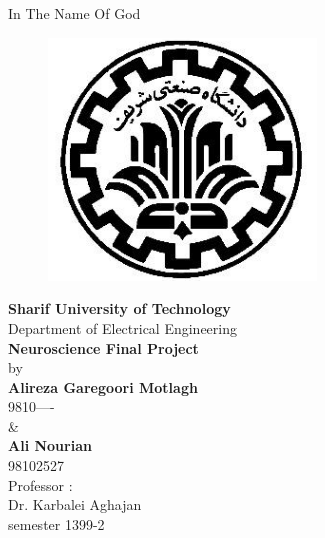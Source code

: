 \documentclass[12pt,a4paper,colorlinks=true]{article}
\begin{document}
	
	
	\begin{center}
		\small In The Name Of God
	\end{center}
	\vspace{0.3in}
	\begin{figure}[h]
		\centering
		\includegraphics[width=2.8in]{SharifLogo.png}
		\label{SharifLogo}
	\end{figure}
	\begin{center}
		\textbf{\Huge Sharif University of Technology}\\
		\vspace{2mm}
		\LARGE Department of Electrical Engineering\\
		\vspace{10mm}
		\textbf{\LARGE Neuroscience Final Project}\\
		\vspace{4mm}
		\large by \\
		\large \textbf{Alireza Garegoori Motlagh}\\
		\large 9810----\\
		\large \&\\
		\large \textbf{Ali Nourian}\\
		\large 98102527\\
		\vspace{10mm}
		\Large Professor :\\
		\Large Dr. Karbalei Aghajan\\
		\vspace{20mm}
		\large semester 1399-2
		
	\end{center}

	\newpage
	
	{
		\hypersetup{linkcolor=black}
		\tableofcontents
	}
	
	\newpage
		
\end{document}
